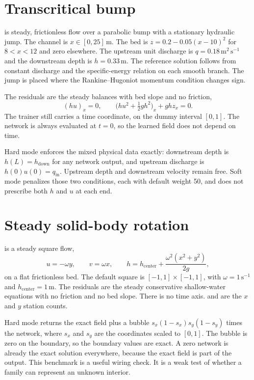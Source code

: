 \section{Transcritical bump}

 is steady, frictionless flow over a parabolic bump with a stationary hydraulic jump.
The channel is \(x\in[0,25]\,\mathrm{m}\).
The bed is \(z = 0.2 - 0.05(x-10)^{2}\) for \(8<x<12\) and zero elsewhere.
The upstream unit discharge is \(q=0.18\,\mathrm{m^{2}\,s^{-1}}\) and the downstream depth is \(h=0.33\,\mathrm{m}\).
The reference solution follows from constant discharge and the specific-energy relation on each smooth branch.
The jump is placed where the Rankine--Hugoniot momentum condition changes sign.

The residuals are the steady balances with bed slope and no friction,
\[
(hu)_{x} = 0,
\qquad
\big(hu^{2} + \tfrac12 g h^{2}\big)_{x} + g h z_{x} = 0.
\]
The trainer still carries a time coordinate, on the dummy interval \([0,1]\).
The network is always evaluated at \(t=0\), so the learned field does not depend on time.

Hard mode enforces the mixed physical data exactly:
downstream depth is \(h(L)=h_{\mathrm{down}}\) for any network output, and upstream discharge is \(h(0)u(0)=q_{\mathrm{in}}\).
Upstream depth and downstream velocity remain free.
Soft mode penalizes those two conditions, each with default weight 50, and does not prescribe both \(h\) and \(u\) at each end.

\section{Steady solid-body rotation}

 is a steady square flow,
\[
u = -\omega y, \qquad v = \omega x,
\qquad
h = h_{\mathrm{center}} + \frac{\omega^{2}(x^{2}+y^{2})}{2g},
\]
on a flat frictionless bed.
The default square is \([-1,1]\times[-1,1]\), with \(\omega=1\,\mathrm{s^{-1}}\) and \(h_{\mathrm{center}}=1\,\mathrm{m}\).
The residuals are the steady conservative shallow-water equations with no friction and no bed slope.
There is no time axis.
 and  are the \(x\) and \(y\) station counts.

Hard mode returns the exact field plus a bubble \(s_{x}(1-s_{x})s_{y}(1-s_{y})\) times the network, where \(s_{x}\) and \(s_{y}\) are the coordinates scaled to \([0,1]\).
The bubble is zero on the boundary, so the boundary values are exact.
A zero network is already the exact solution everywhere, because the exact field is part of the output.
This benchmark is a useful wiring check.
It is a weak test of whether a family can represent an unknown interior.

